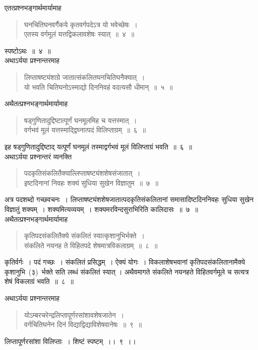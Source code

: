 \documentclass[11pt, openany]{book}
\begin{document}
\indent
एतत्प्रश्नभङ्गार्थमार्यामाह\textendash
\begin{quote}
{\ks घनचितिघनवर्गैकये कृतवर्गपदेऽत्र यो भवेच्छेषः~।\\
एतस्य वर्गमूलं यत्तद्विकलावशेषः स्यात्~॥~४~॥}
\end{quote}
\indent
स्पष्टोऽथः~॥~४~॥\\

\indent
अथाऽर्यया प्रश्नान्तरमाह\textendash\
\begin{quote}
{\ks लिप्ताषष्ट्यंशाग्रे जातात्संकलितघनचितिघनैक्यात्~।\\
यो भवति चितिघनोऽस्माद्यो दिननिवहं वदत्यसौ धीमान्~॥~५~॥}
\end{quote}

\indent
अथैतत्प्रश्नभङ्गार्थमार्यामाह\textendash
\begin{quote}
{\ks षड्गुणितादुद्दिष्टात्पूर्णं घनमूलमिह च यत्तस्मात्~।\\
वर्गभवं मूलं यत्तस्माद्द्विघ्नात्पदं विलिप्ताग्रम्~॥~६~॥}
\end{quote}
\indent
इह षड्गुणितादुद्दिष्टाद् यत्पूर्णं घनमूलं तस्माद्वर्गभवं मूलं विलिप्ताग्रं भवति~॥~६~॥\\

\indent
अथाऽर्यया प्रश्नान्तरं व्यनक्ति\textendash
\begin{quote}
{\ks पदकृतिसंकलितैक्याल्लिप्ताषष्ट्यंशशेषसंजातात्~।\\
इष्टदिनानां निवहः शक्यं सुधिया सुखेन विज्ञातुम~॥~७~॥}
\end{quote}
\indent
अत्र पदशब्दो गच्छवचनः~। लिप्ताषष्ट्यंशशेषजातात्पदकृतिसंकलितानां समासादिष्टदिननिवहः सुधिया सुखेन विज्ञातुं शक्यम्~। शक्यमित्यव्ययम्~। शक्यमरविन्दसुराभिरिति कालिदासः~॥~७~॥\\

\indent
अथैतत्प्रश्नभङ्गार्थमार्यामाह\textendash
\begin{quote}
{\ks कृतिपदसंकलितैक्ये संकलितं स्यात्कृशानुभिर्भक्ते~।\\
संकलिते नयनह ते विहितपदे शेषमात्रविकलाग्रम्~॥~८~॥}
\end{quote}

\newpage
\thispagestyle{fancy}
\fancyhf{}

\indent
कृतिर्वर्गः~। पदं गच्छः~। संकलितं प्रसिद्धम्~। ऐक्यं योगः~। विकलाशेषभवानां कृतिपदसंकलितानामैक्ये कृशानुभि~(३)~र्भक्ते सति लब्धं संकलितं स्यात् । अथैवमागते संकलिते नयनहते विहितवर्गमूले च सत्यत्र शेषं विकलाग्रं भवति~॥~८~॥

\indent
अथाऽर्यया प्रश्नान्तरमाह\textendash
\begin{quote}
{\ks योऽम्बरचरेन्द्रलिप्तापूर्णरसांशावशेषजातेन~।\\
वर्गचितिघनेन दिनं विद्याद्विद्याविशेषवानेषः~॥~९~॥}
\end{quote}
\indent
लिप्तापूर्णरसांशा विलिप्ताः~। शिष्टं स्पष्टम्~।।~९~।।\\
\end{document}

